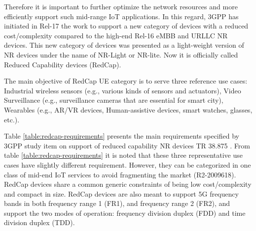 \documentclass[conference]{IEEEtran}
\begin{document}
Therefore it is important to further optimize the network resources and more efficiently support such mid-range IoT applications. In this regard, 3GPP has initiated in Rel-17 the work to support a new category of devices with a reduced cost/complexity compared to the high-end Rel-16 eMBB and URLLC NR devices. This new category of devices was presented as a light-weight version of NR devices under the name of NR-Light or NR-lite. Now it is officially called Reduced Capability devices (RedCap).

The main objective of RedCap UE category is to serve three reference use cases: Industrial wireless sensors (e.g., various kinds of sensors and actuators), Video Surveillance (e.g., surveillance cameras that are essential for smart city), Wearables (e.g., AR/VR devices, Human-assistive devices, smart watches, glasses,  etc.).

Table \ref{table:redcap-requirements} presents the main requirements specified by 3GPP study item on support of reduced capability NR devices TR 38.875 \cite{3gpp.38.875}. From table \ref{table:redcap-requirements} it is noted that these three representative use cases have slightly different requirement. However, they can be categorized in one class of mid-end IoT services to avoid fragmenting the market (R2-2009618\cite{3gpp_framework_2020_R2-2009618}). RedCap devices share a common generic constraints of being low cost/complexity and compact in size. RedCap devices are also meant to support 5G frequency bands in both frequency range 1 (FR1), and frequency range 2 (FR2), and support the two modes of operation: frequency division duplex (FDD) and time division duplex (TDD).
\end{document}
